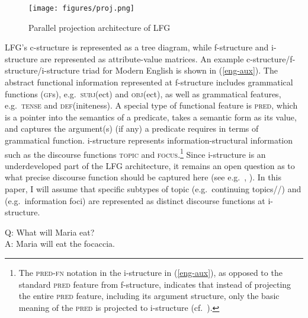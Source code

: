\documentclass[output=paper,colorlinks,citecolor=brown]{langscibook}
\begin{document}
\begin{figure}
     \texttt{[image: figures/proj.png]}
    \caption{Parallel projection architecture of LFG  \citep[369]{asudeh2006direct}}
    \label{fig:proj-arch}
\end{figure}

LFG's c-structure is represented as a tree diagram, while f-structure and i-structure are represented as attribute-value matrices. An example c-structure/f-structure/i-structure triad for Modern English is shown in (\ref{eng-aux}). The abstract functional information represented at f-structure includes grammatical functions (\textsc{gf}s), e.g.~\textsc{subj}(ect) and \textsc{obj}(ect),
as well as grammatical features, e.g.~\textsc{tense} and \textsc{def}(initeness). A special type of functional feature is \textsc{pred}, which is a pointer into the semantics of a predicate, takes a semantic form as its value, and captures the argument(s) (if any) a predicate requires in terms of grammatical function. i-structure represents information-structural information such as the discourse functions \textsc{topic} and \textsc{focus}.\footnote{The \textsc{pred-fn} notation in the i-structure in (\ref{eng-aux}), as opposed to the standard \textsc{pred} feature from f-structure, indicates that instead of projecting the entire \textsc{pred} feature, including its argument structure, only the basic meaning of the \textsc{pred} is projected to i-structure (cf.~\citealp{kaplan1996grammar,king1997focus,buttjabeen16}).} Since i-structure is an underdeveloped part of the LFG architecture, it remains an open question as to what precise discourse function should be captured here (see e.g.~\citealp[chapter 10]{dalrymple2019oxford}, \citealp{zaenenforthcoming-handbook-IS}). In this paper, I will assume that specific subtypes of topic (e.g.~continuing topics//) and  (e.g.~information foci) are represented as distinct discourse functions at i-structure.

\ea 
\label{eng-aux} 
\begin{small}
Q: What will Maria eat?\\
A: Maria will eat the focaccia. 
\end{small}

\vspace{2ex}
\end{document}
